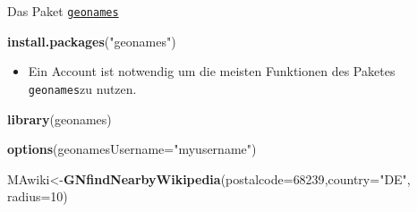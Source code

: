 \documentclass[ignorenonframetext,]{beamer}
\newenvironment{Shaded}{\begin{snugshade}}{\end{snugshade}}
\newcommand{\DataTypeTok}[1]{\textcolor[rgb]{0.13,0.29,0.53}{#1}}
\newcommand{\DecValTok}[1]{\textcolor[rgb]{0.00,0.00,0.81}{#1}}
\newcommand{\KeywordTok}[1]{\textcolor[rgb]{0.13,0.29,0.53}{\textbf{#1}}}
\newcommand{\NormalTok}[1]{#1}
\newcommand{\StringTok}[1]{\textcolor[rgb]{0.31,0.60,0.02}{#1}}
\providecommand{\tightlist}{%
  \setlength{\itemsep}{0pt}\setlength{\parskip}{0pt}}
\begin{document}
\begin{frame}[fragile]{Das Paket
\href{https://github.com/ropensci/geonames}{\texttt{geonames}}}
\protect\hypertarget{das-paket-geonames}{}

\begin{Shaded}
\begin{Highlighting}[]
\KeywordTok{install.packages}\NormalTok{(}\StringTok{"geonames"}\NormalTok{)}
\end{Highlighting}
\end{Shaded}

\begin{itemize}
\tightlist
\item
  Ein Account ist notwendig um die meisten Funktionen des Paketes
  \texttt{geonames}zu nutzen.
\end{itemize}

\begin{Shaded}
\begin{Highlighting}[]
\KeywordTok{library}\NormalTok{(geonames)}
\end{Highlighting}
\end{Shaded}

\begin{Shaded}
\begin{Highlighting}[]
\KeywordTok{options}\NormalTok{(}\DataTypeTok{geonamesUsername=}\StringTok{"myusername"}\NormalTok{)}
\end{Highlighting}
\end{Shaded}

\begin{Shaded}
\begin{Highlighting}[]
\NormalTok{MAwiki<-}\KeywordTok{GNfindNearbyWikipedia}\NormalTok{(}\DataTypeTok{postalcode=}\DecValTok{68239}\NormalTok{,}\DataTypeTok{country=}\StringTok{"DE"}\NormalTok{,}
                              \DataTypeTok{radius=}\DecValTok{10}\NormalTok{)}
\end{Highlighting}
\end{Shaded}

\end{frame}
\end{document}
